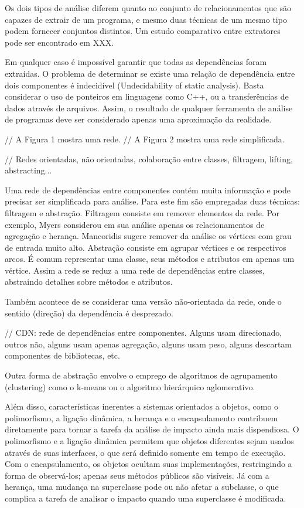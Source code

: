 \documentclass{article}
\begin{document}
Os dois tipos de análise diferem quanto ao conjunto de relacionamentos que são capazes de extrair de um programa, e mesmo duas técnicas de um mesmo tipo podem fornecer conjuntos distintos. Um estudo comparativo entre extratores pode ser encontrado em XXX. 

Em qualquer caso é impossível garantir que todas as dependências foram extraídas. O problema de determinar se existe uma relação de dependência entre dois componentes é indecidível (Undecidability of static analysis). Basta considerar o uso de ponteiros em linguagens como C++, ou a transferências de dados através de arquivos. Assim, o resultado de qualquer ferramenta de análise de programas deve ser considerado apenas uma aproximação da realidade.

// A Figura 1 mostra uma rede.
// A Figura 2 mostra uma rede simplificada.

// Redes orientadas, não orientadas, colaboração entre classes, filtragem, lifting, abstracting...

Uma rede de dependências entre componentes contém muita informação e pode precisar ser simplificada para análise. Para este fim são empregadas duas técnicas: filtragem e abstração. Filtragem consiste em remover elementos da rede. Por exemplo, Myers considerou em sua análise apenas os relacionamentos de agregação e herança. Mancoridis sugere remover da análise os vértices com grau de entrada muito alto. Abstração consiste em agrupar vértices e os respectivos arcos. É comum representar uma classe, seus métodos e atributos em apenas um vértice. Assim a rede se reduz a uma rede de dependências entre classes, abstraindo detalhes sobre métodos e atributos.

Também acontece de se considerar uma versão não-orientada da rede, onde o sentido (direção) da dependência é desprezado.

// CDN: rede de dependências entre componentes.
Alguns usam direcionado, outros não, alguns usam apenas agregação, alguns usam peso, alguns descartam componentes de bibliotecas, etc.


Outra forma de abstração envolve o emprego de algoritmos de agrupamento (clustering) como o k-means ou o algoritmo hierárquico aglomerativo.

    Além disso, características inerentes a sistemas orientados a objetos, como o polimorfismo, a ligação dinâmica, a herança e o encapsulamento contribuem diretamente para tornar a tarefa da análise de impacto ainda mais dispendiosa. O polimorfismo e a ligação dinâmica permitem que objetos diferentes sejam usados através de suas interfaces, o que será definido somente em tempo de execução. Com o encapsulamento, os objetos ocultam suas implementações, restringindo a forma de observá-los; apenas seus métodos públicos são visíveis. Já com a herança, uma mudança na superclasse pode ou não afetar a subclasse, o que complica a tarefa de analisar o impacto quando uma superclasse é modificada.
\end{document}
